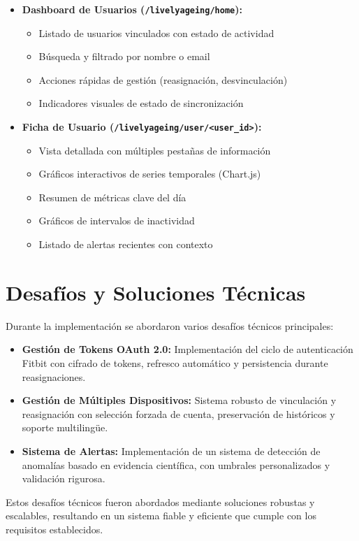 \begin{itemize}
    \item \textbf{Dashboard de Usuarios (\texttt{/livelyageing/home}):}
        \begin{itemize}
            \item Listado de usuarios vinculados con estado de actividad
            \item Búsqueda y filtrado por nombre o email
            \item Acciones rápidas de gestión (reasignación, desvinculación)
            \item Indicadores visuales de estado de sincronización
        \end{itemize}
    \item \textbf{Ficha de Usuario (\texttt{/livelyageing/user/<user\_id>}):}
        \begin{itemize}
            \item Vista detallada con múltiples pestañas de información
            \item Gráficos interactivos de series temporales (Chart.js)
            \item Resumen de métricas clave del día
            \item Gráficos de intervalos de inactividad
            \item Listado de alertas recientes con contexto
        \end{itemize}
\end{itemize}

\section{Desafíos y Soluciones Técnicas}
\label{sec:impl_desafios}

Durante la implementación se abordaron varios desafíos técnicos principales:

\begin{itemize}
    \item \textbf{Gestión de Tokens OAuth 2.0:} Implementación del ciclo de autenticación Fitbit con cifrado de tokens, refresco automático y persistencia durante reasignaciones.
    
    \item \textbf{Gestión de Múltiples Dispositivos:} Sistema robusto de vinculación y reasignación con selección forzada de cuenta, preservación de históricos y soporte multilingüe.
    
    \item \textbf{Sistema de Alertas:} Implementación de un sistema de detección de anomalías basado en evidencia científica, con umbrales personalizados y validación rigurosa.

\end{itemize}

Estos desafíos técnicos fueron abordados mediante soluciones robustas y escalables, resultando en un sistema fiable y eficiente que cumple con los requisitos establecidos.

